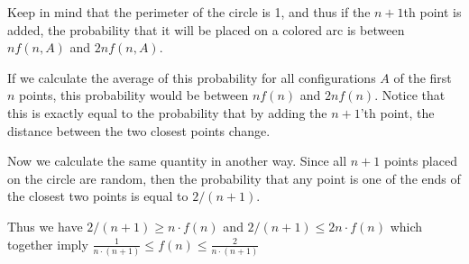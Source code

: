 \begin{solution}
Keep in mind that the perimeter of the circle is 1, and thus if the $n+1$th point is added, the probability that it will be placed on a colored arc is between
$n f(n,A)$
and
$2nf(n,A)$.

If we calculate the average of this probability for all configurations $A$ of the first $n$ points, this probability would be between
$nf(n)$
and $2nf(n)$.  Notice that this is exactly equal to the probability that by adding the $n+1$'th point, the distance between the two closest points change.

Now we calculate the same quantity in another way.
Since all $n+1$ points placed on the circle are random, then the probability that any point is one of the ends of the closest two points is equal to
$2/(n+1)$.

Thus we have $2/(n+1) \geq n\cdot f(n)$ and $2/(n+1) \leq 2n\cdot f(n)$ which together imply $\frac{1}{n\cdot(n+1)} \leq f(n) \leq \frac{2}{n\cdot(n+1)}$
\end{solution}
